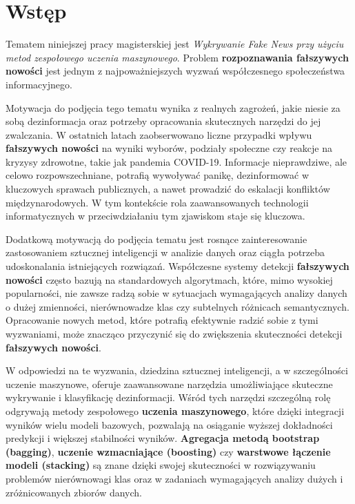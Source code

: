 \chapter{Wstęp}

Tematem niniejszej pracy magisterskiej jest \emph{Wykrywanie Fake News
	przy użyciu metod zespołowego uczenia maszynowego}. Problem \textbf{rozpoznawania fałszywych nowości} jest jednym z
najpoważniejszych wyzwań współczesnego społeczeństwa informacyjnego.

Motywacja do podjęcia tego tematu wynika z realnych zagrożeń, jakie
niesie za sobą dezinformacja oraz potrzeby opracowania skutecznych
narzędzi do jej zwalczania. W ostatnich latach zaobserwowano liczne
przypadki wpływu \textbf{fałszywych nowości} na wyniki wyborów, podziały
społeczne czy reakcje na kryzysy zdrowotne, takie jak pandemia COVID-19.
Informacje nieprawdziwe, ale celowo rozpowszechniane, potrafią wywoływać
panikę, dezinformować w kluczowych sprawach publicznych, a nawet
prowadzić do eskalacji konfliktów międzynarodowych. W tym kontekście
rola zaawansowanych technologii informatycznych w przeciwdziałaniu tym
zjawiskom staje się kluczowa.

Dodatkową motywacją do podjęcia tematu jest rosnące zainteresowanie
zastosowaniem sztucznej inteligencji w analizie danych oraz
ciągła potrzeba udoskonalania istniejących rozwiązań. Współczesne
systemy detekcji \textbf{fałszywych nowości} często bazują na standardowych
algorytmach, które, mimo wysokiej popularności, nie zawsze radzą sobie w
sytuacjach wymagających analizy danych o dużej zmienności, nierównowadze
klas czy subtelnych różnicach semantycznych. Opracowanie nowych metod,
które potrafią efektywnie radzić sobie z tymi wyzwaniami, może znacząco
przyczynić się do zwiększenia skuteczności detekcji \textbf{fałszywych nowości}.

W odpowiedzi na te wyzwania, dziedzina sztucznej inteligencji, a w
szczególności uczenie maszynowe, oferuje zaawansowane narzędzia
umożliwiające skuteczne wykrywanie i klasyfikację dezinformacji. Wśród
tych narzędzi szczególną rolę odgrywają metody zespołowego
\textbf{uczenia maszynowego}, które dzięki
integracji wyników wielu modeli bazowych, pozwalają na osiąganie wyższej
dokładności predykcji i większej stabilności wyników. \textbf{Agregacja metodą bootstrap (bagging)}, \textbf{uczenie wzmacniające (boosting)} czy \textbf{warstwowe łączenie modeli (stacking)} są znane dzięki swojej skuteczności w rozwiązywaniu problemów
nierównowagi klas oraz w zadaniach wymagających analizy dużych i
zróżnicowanych zbiorów danych.

